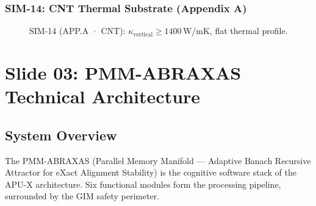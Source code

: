 \documentclass[12pt, a4paper]{article}
\begin{document}
\subsubsection{SIM-14: CNT Thermal Substrate (Appendix A)}

\begin{figure}[H]
  \centering
  \caption{SIM-14 (APP.A · CNT): $\kappa_{\text{vertical}} \geq 1400\,\text{W/mK}$, flat thermal profile.}
  \label{fig:sim14}
\end{figure}

\section{Slide 03: PMM-ABRAXAS Technical Architecture}
\label{sec:pmm}

\subsection{System Overview}

The PMM-ABRAXAS (Parallel Memory Manifold --- Adaptive Banach Recursive Attractor
for eXact Alignment Stability) is the cognitive software stack of the APU-X
architecture. Six functional modules form the processing pipeline, surrounded
by the GIM safety perimeter.
\end{document}
